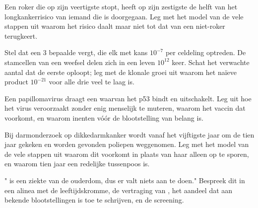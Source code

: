 \begin{exercise}[$\star\star$]\label{exo:g11:cancer:11}
Een roker die op zijn veertigste stopt, heeft op zijn zestigste de helft
van het longkankerrisico van iemand die is doorgegaan. Leg met het model
van de vele stappen uit waarom het risico daalt maar niet tot dat van een
niet-roker terugkeert.
\end{exercise}

\begin{exercise}[$\star\star\star$]\label{exo:g11:cancer:12}
Stel dat een  3 bepaalde  vergt, die elk met kans $10^{-7}$
per celdeling optreden. De stamcellen van een weefsel delen zich in een
leven $10^{12}$ keer. Schat het verwachte aantal  dat de eerste
 oploopt; leg met de klonale groei uit waarom het naïeve product
$10^{-21}$ voor alle drie veel te laag is.
\end{exercise}

\begin{exercise}[$\star\star\star$]\label{exo:g11:cancer:13}
Een papillomavirus draagt een  waarvan het  p53 bindt en
uitschakelt. Leg uit hoe het virus  veroorzaakt zonder enig
menselijk  te muteren, waarom het vaccin dat voorkomt, en waarom
inenten vóór de blootstelling van belang is.
\end{exercise}

\begin{exercise}[$\star\star\star$]\label{exo:g11:cancer:14}
Bij darmonderzoek op dikkedarmkanker wordt vanaf het vijftigste jaar om
de tien jaar gekeken en worden gevonden poliepen weggenomen. Leg met het
model van de vele stappen uit waarom dit  voorkomt in plaats van
haar alleen op te sporen, en waarom tien jaar een redelijke tussenpoos is.
\end{exercise}

\begin{exercise}[$\star\star\star$]\label{exo:g11:cancer:15}
" is een ziekte van de ouderdom, dus er valt niets aan te doen."
Bespreek dit in een alinea met de leeftijdskromme, de vertraging van
, het aandeel  dat aan bekende blootstellingen is toe
te schrijven, en de screening.
\end{exercise}


